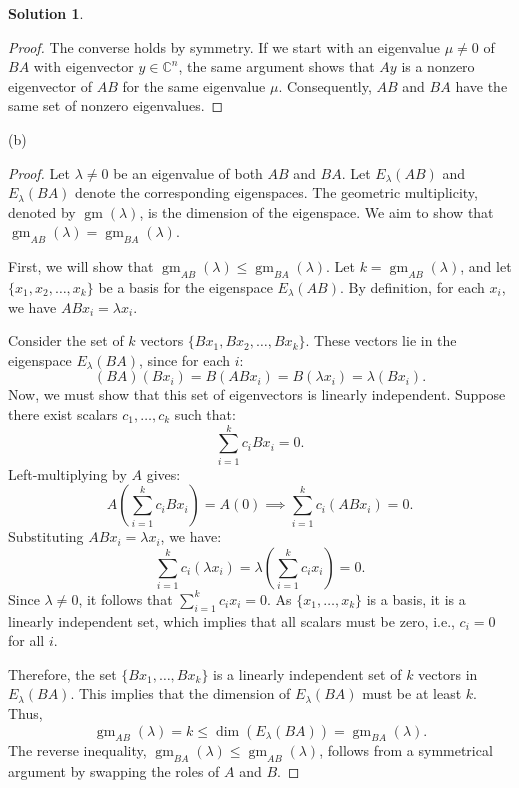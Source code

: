 \documentclass[12pt]{article}
\theoremstyle{definition}
\newtheorem*{solution}{\normalfont\textbf{Solution}}
\DeclareMathOperator{\gm}{gm}
\begin{document}
\begin{enumerate}[leftmargin=*]
\begin{solution}
\begin{proof}
                The converse holds by symmetry. If we start with an eigenvalue \(\mu \neq 0\) of \(BA\) with eigenvector \(y \in \mathbb{C}^n\), the same argument shows that \(Ay\) is a nonzero eigenvector of \(AB\) for the same eigenvalue \(\mu\). Consequently, \(AB\) and \(BA\) have the same set of nonzero eigenvalues.
                        \end{proof}
        \item[(b)]
            \begin{proof}
                Let \(\lambda \neq 0\) be an eigenvalue of both \(AB\) and \(BA\). Let \(E_{\lambda}(AB)\) and \(E_{\lambda}(BA)\) denote the corresponding eigenspaces. 
                The geometric multiplicity, denoted by \(\gm(\lambda)\), is the dimension of the eigenspace. We aim to show that \(\gm_{AB}(\lambda) = \gm_{BA}(\lambda)\).

                First, we will show that \(\gm_{AB}(\lambda) \leq \gm_{BA}(\lambda)\).
                Let \(k = \gm_{AB}(\lambda)\), and let \(\{x_1, x_2, \dots, x_k\}\) be a basis for the eigenspace \(E_{\lambda}(AB)\). By definition, for each \(x_i\), we have \(ABx_i = \lambda x_i\).

                Consider the set of \(k\) vectors \(\{Bx_1, Bx_2, \dots, Bx_k\}\). These vectors lie in the eigenspace \(E_{\lambda}(BA)\), since for each \(i\):
                \[
                    (BA)(Bx_i) = B(ABx_i) = B(\lambda x_i) = \lambda(Bx_i).
                \]
                Now, we must show that this set of eigenvectors is linearly independent. Suppose there exist scalars \(c_1, \dots, c_k\) such that:
                \[
                    \sum_{i=1}^{k} c_i Bx_i = 0.
                \]
                Left-multiplying by \(A\) gives:
                \[
                    A\left(\sum_{i=1}^{k} c_i Bx_i\right) = A(0) \implies \sum_{i=1}^{k} c_i (ABx_i) = 0.
                \]
                Substituting \(ABx_i = \lambda x_i\), we have:
                \[
                    \sum_{i=1}^{k} c_i (\lambda x_i) = \lambda \left(\sum_{i=1}^{k} c_i x_i\right) = 0.
                \]
                Since \(\lambda \neq 0\), it follows that \(\sum_{i=1}^{k} c_i x_i = 0\). As \(\{x_1, \dots, x_k\}\) is a basis, it is a linearly independent set, which implies that all scalars must be zero, i.e., \(c_i = 0\) for all \(i\).

                Therefore, the set \(\{Bx_1, \dots, Bx_k\}\) is a linearly independent set of \(k\) vectors in \(E_{\lambda}(BA)\). This implies that the dimension of \(E_{\lambda}(BA)\) must be at least \(k\). Thus,
                \[
                    \gm_{AB}(\lambda) = k \leq \dim(E_{\lambda}(BA)) = \gm_{BA}(\lambda).
                \]
                The reverse inequality, \(\gm_{BA}(\lambda) \leq \gm_{AB}(\lambda)\), follows from a symmetrical argument by swapping the roles of \(A\) and \(B\).


\end{proof}
\end{solution}
\end{enumerate}
\end{document}
